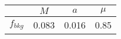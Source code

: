 \begin{tabular}{c||c|c|c}
 & $M$ & $a$ & $\mu$  \\
\hline
$f_{bkg}$  & 0.083 & 0.016 & 0.85\\
\end{tabular}
